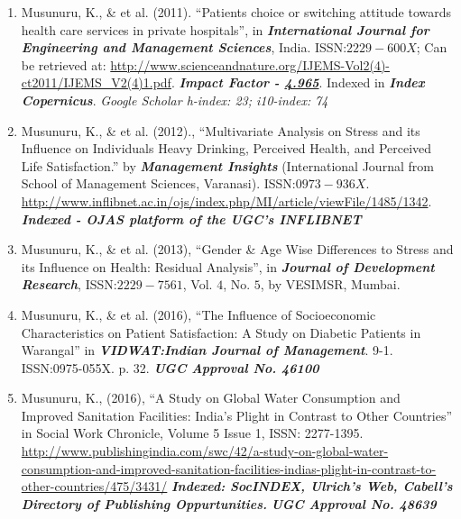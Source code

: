 \documentclass[10pt]{article}
\begin{document}
\begin{enumerate} 

\item Musunuru, K., \& et al. (2011). \enquote{Patients choice or switching attitude towards health care services in private hospitals}, in  \textit{\textbf{International Journal for Engineering and Management Sciences}}, India. ISSN:$2229-600X$; Can be retrieved at: \url{http://www.scienceandnature.org/IJEMS-Vol2(4)-ct2011/IJEMS_V2(4)1.pdf}. \emph{\textbf{Impact Factor - \href{http://www.scienceandnature.org/Impact_Factor.php}{4.965}}}. Indexed in \emph{\textbf{Index Copernicus}}. \emph{Google Scholar h-index: 23; i10-index: 74}

\item Musunuru, K., \& et al. (2012)., \enquote{Multivariate Analysis on Stress and its Influence on Individuals Heavy Drinking,  Perceived Health,  and  Perceived  Life  Satisfaction.}  by  \textit{\textbf{Management  Insights}} (International Journal from School of Management Sciences, Varanasi). ISSN:$0973-936X$. \url{http://www.inflibnet.ac.in/ojs/index.php/MI/article/viewFile/1485/1342}. \emph{\textbf{Indexed - OJAS platform of the UGC’s INFLIBNET}}

\item Musunuru, K., \& et al. (2013), \enquote{Gender & Age Wise Differences to Stress and its Influence on Health: Residual Analysis},  in \textit{\textbf{Journal  of  Development  Research}},  ISSN:$2229-7561$, Vol. $4$,  No.  $5$,  by VESIMSR, Mumbai. 

\item Musunuru, K., \& et al. (2016), \enquote{The Influence of Socioeconomic Characteristics on Patient Satisfaction: A Study on Diabetic Patients in Warangal} in \emph{\textbf{VIDWAT:Indian Journal of Management}}. 9-1. ISSN:0975-055X. p. 32. \emph{\textbf{UGC Approval No. 46100}}

\begin{comment} 
\item Musunuru, K., (2011), \enquote{A study on patient education and its impact on their satisfaction in private hospitals}, in \textit{\textbf{$14^{th}$ national seminar}} held in  Symbiosis International University, Lavle, Pune. The same paper got Published  in  The  Health  Times  (SCHC  official  journal),  ISBN: $81-7418-296-9$, p.$70$, \url{http://www.schcpune.org/schcnewsite/health_times/SYmbiosis_Health_Times_II.pdf}
\end{comment} 

\item Musunuru, K., (2016), \enquote{A Study on Global Water Consumption and Improved Sanitation Facilities: India’s Plight in Contrast to Other Countries} in Social Work Chronicle, Volume 5 Issue 1, ISSN: 2277-1395. \url{http://www.publishingindia.com/swc/42/a-study-on-global-water-consumption-and-improved-sanitation-facilities-indias-plight-in-contrast-to-other-countries/475/3431/} \emph{\textbf{Indexed: SocINDEX, Ulrich's Web, Cabell's Directory of Publishing Oppurtunities.}} \emph{\textbf{UGC Approval No. 48639}}


\end{enumerate}
\end{document}

